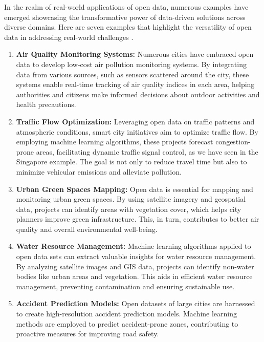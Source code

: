 In the realm of real-world applications of open data, numerous examples have emerged showcasing the transformative power of data-driven solutions across diverse domains. Here are seven examples that highlight the versatility of open data in addressing real-world challenges \cite{electronics10232997}.
\begin{enumerate}
\item \textbf{Air Quality Monitoring Systems:}
   Numerous cities have embraced open data to develop low-cost air pollution monitoring systems. By integrating data from various sources, such as sensors scattered around the city, these systems enable real-time tracking of air quality indices in each area, helping authorities and citizens make informed decisions about outdoor activities and health precautions.

\item \textbf{Traffic Flow Optimization:}
   Leveraging open data on traffic patterns and atmospheric conditions, smart city initiatives aim to optimize traffic flow. By employing machine learning algorithms, these projects forecast congestion-prone areas, facilitating dynamic traffic signal control, as we have seen in the Singapore example. The goal is not only to reduce travel time but also to minimize vehicular emissions and alleviate pollution.

\item \textbf{Urban Green Spaces Mapping:}
   Open data is essential for mapping and monitoring urban green spaces. By using satellite imagery and geospatial data, projects can identify areas with vegetation cover, which helps city planners improve green infrastructure. This, in turn, contributes to better air quality and overall environmental well-being.

\item \textbf{Water Resource Management:}
   Machine learning algorithms applied to open data sets can extract valuable insights for water resource management. By analyzing satellite images and GIS data, projects can identify non-water bodies like urban areas and vegetation. This aids in efficient water resource management, preventing contamination and ensuring sustainable use.

\item \textbf{Accident Prediction Models:}
   Open datasets of large cities are harnessed to create high-resolution accident prediction models. Machine learning methods are employed to predict accident-prone zones, contributing to proactive measures for improving road safety.
   

\end{enumerate}
